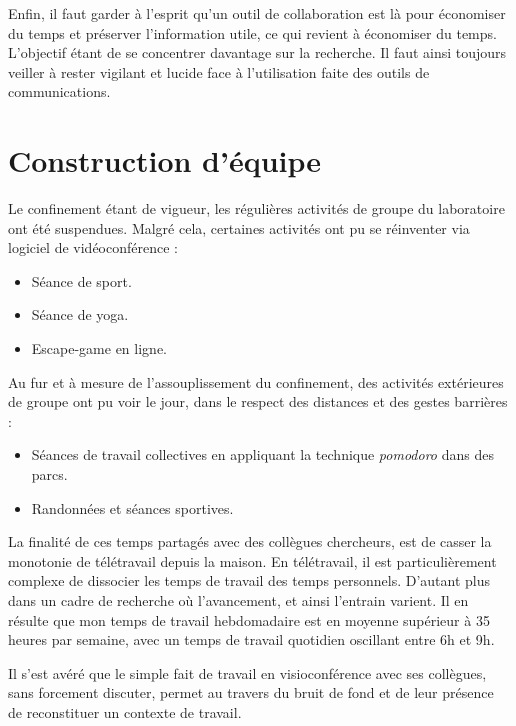 Enfin, il faut garder à l'esprit qu'un outil de collaboration est là pour économiser du temps et préserver l'information utile, ce qui revient à économiser du temps. L'objectif étant de se concentrer davantage sur la recherche. Il faut ainsi toujours veiller à rester vigilant et lucide face à l'utilisation faite des outils de communications.


        \section{Construction d'équipe}
        
Le confinement étant de vigueur, les régulières activités de groupe du laboratoire ont été suspendues. Malgré cela, certaines activités ont pu se réinventer via logiciel de vidéoconférence :
\begin{itemize}
\setlength\itemsep{-0.5em}
\item Séance de sport.
\item Séance de yoga.
\item Escape-game en ligne.
\end{itemize}

Au fur et à mesure de l'assouplissement du confinement, des activités extérieures de groupe ont pu voir le jour, dans le respect des distances et des gestes barrières :
\begin{itemize}
\setlength\itemsep{-0.5em}
\item Séances de travail collectives en appliquant la technique \emph{\gls{pomodoro}} dans des parcs.
\item Randonnées et séances sportives.
\end{itemize}

La finalité de ces temps partagés avec des collègues chercheurs, est de casser la monotonie de télétravail depuis la maison. En télétravail, il est particulièrement complexe de dissocier les temps de travail des temps personnels. D'autant plus dans un cadre de recherche où l'avancement, et ainsi l'entrain varient. Il en résulte que mon temps de travail hebdomadaire est en moyenne supérieur à 35 heures par semaine, avec un temps de travail quotidien oscillant entre 6h et 9h.

Il s'est avéré que le simple fait de travail en visioconférence avec ses collègues, sans forcement discuter, permet au travers du bruit de fond et de leur présence de reconstituer un contexte de travail.
